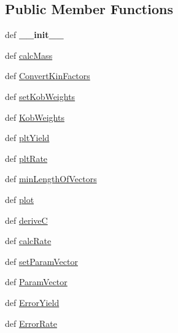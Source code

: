 \subsection*{\-Public \-Member \-Functions}
\begin{DoxyCompactItemize}
\item 
\hypertarget{classFit__one__run_1_1Kobayashi_a14ff386fca6ed35285607b5a8d5724c0}{def {\bfseries \-\_\-\-\_\-init\-\_\-\-\_\-}}\label{classFit__one__run_1_1Kobayashi_a14ff386fca6ed35285607b5a8d5724c0}

\item 
def \hyperlink{classFit__one__run_1_1Kobayashi_a677867f15bf6bb70605b88b7e8607a43}{calc\-Mass}
\item 
def \hyperlink{classFit__one__run_1_1Kobayashi_a3ac4ca157fc46013544cb6ed2db71b3b}{\-Convert\-Kin\-Factors}
\item 
def \hyperlink{classFit__one__run_1_1Kobayashi_a2530abc97e0199bc54d188064c963e78}{set\-Kob\-Weights}
\item 
def \hyperlink{classFit__one__run_1_1Kobayashi_ae381071f0fb8e9c239923a711d338eca}{\-Kob\-Weights}
\item 
def \hyperlink{classFit__one__run_1_1Model_aa304b32155938a713c33f0dc03a135f3}{plt\-Yield}
\item 
def \hyperlink{classFit__one__run_1_1Model_a9c28d95902adf00f5aaa642f0919fc61}{plt\-Rate}
\item 
def \hyperlink{classFit__one__run_1_1Model_a26fc879ca33c9171ebb4a97bc4b0c46b}{min\-Length\-Of\-Vectors}
\item 
def \hyperlink{classFit__one__run_1_1Model_a98159c954f1f1be2a34be3ea53d11493}{plot}
\item 
def \hyperlink{classFit__one__run_1_1Model_ace9df4177c5ae753dbe190e2f8268149}{derive\-C}
\item 
def \hyperlink{classFit__one__run_1_1Model_a07ae4534de2a6ef241d71facdffb227e}{calc\-Rate}
\item 
def \hyperlink{classFit__one__run_1_1Model_a174aec9b05dbe01ec103f7ba75d6516c}{set\-Param\-Vector}
\item 
def \hyperlink{classFit__one__run_1_1Model_a3c9239f0ac062fdae0bda395636c0372}{\-Param\-Vector}
\item 
def \hyperlink{classFit__one__run_1_1Model_aa2bc4ba19704350fb2ff441734b51b10}{\-Error\-Yield}
\item 
def \hyperlink{classFit__one__run_1_1Model_aad63c345c343f0c7d1cf20135dc0a0e5}{\-Error\-Rate}
\end{DoxyCompactItemize}
